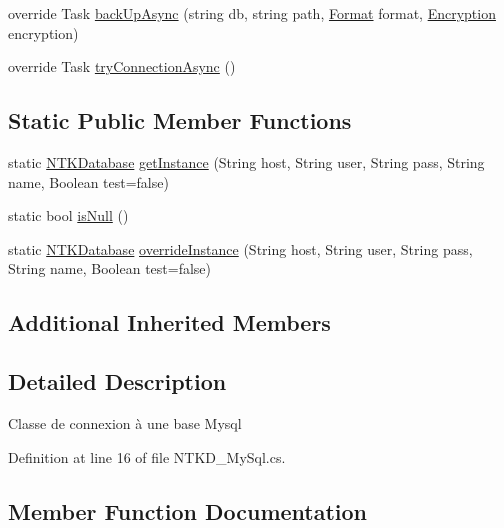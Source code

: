 \begin{DoxyCompactItemize}
\item 
override Task \mbox{\hyperlink{class_n_t_k_1_1_database_1_1_n_t_k_d___my_sql_a4c0b3db544fc2ee9c4980e189d141f68}{back\+Up\+Async}} (string db, string path, \mbox{\hyperlink{namespace_n_t_k_1_1_database_a9bed700210ca4ed5854002637b664789}{Format}} format, \mbox{\hyperlink{namespace_n_t_k_1_1_database_aa21afe93187a6c77c4ccdc988b3c4ac2}{Encryption}} encryption)
\item 
override Task \mbox{\hyperlink{class_n_t_k_1_1_database_1_1_n_t_k_d___my_sql_afc4726c38df980c6da5a1c41711da387}{try\+Connection\+Async}} ()
\end{DoxyCompactItemize}
\subsection*{Static Public Member Functions}
\begin{DoxyCompactItemize}
\item 
static \mbox{\hyperlink{class_n_t_k_1_1_database_1_1_n_t_k_database}{N\+T\+K\+Database}} \mbox{\hyperlink{class_n_t_k_1_1_database_1_1_n_t_k_d___my_sql_a7707d0f0991f8113b24848988b20e842}{get\+Instance}} (String host, String user, String pass, String name, Boolean test=false)
\item 
static bool \mbox{\hyperlink{class_n_t_k_1_1_database_1_1_n_t_k_d___my_sql_a95e373d9068a22b4f5ae238e7d1d77d3}{is\+Null}} ()
\item 
static \mbox{\hyperlink{class_n_t_k_1_1_database_1_1_n_t_k_database}{N\+T\+K\+Database}} \mbox{\hyperlink{class_n_t_k_1_1_database_1_1_n_t_k_d___my_sql_a85dbe81c5c344e25c6572f077a8bdea0}{override\+Instance}} (String host, String user, String pass, String name, Boolean test=false)
\end{DoxyCompactItemize}
\subsection*{Additional Inherited Members}


\subsection{Detailed Description}
Classe de connexion à une base Mysql 



Definition at line 16 of file N\+T\+K\+D\+\_\+\+My\+Sql.\+cs.



\subsection{Member Function Documentation}
\mbox{\label{class_n_t_k_1_1_database_1_1_n_t_k_d___my_sql_a88e3c9a7419410607cd95b4c66bc311c}} 
